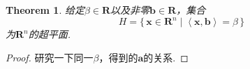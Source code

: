 \documentclass{article}
\newtheorem{theorem}{Theorem}[section]
\newcommand\Set[2]{\{\,#1\mid#2\,\}} %
\newcommand{\vect}[1]{\mathbf{#1}} %
\newcommand{\thereal}{\mathbf{R}} %
\newcommand{\inprod}[2]{\left<#1,#2\right>} %
\begin{document}
\begin{theorem}
\rm 给定$\beta \in \thereal$以及非零$\vect{b} \in \thereal$，集合
$$
H = \Set{\vect{x} \in \thereal^n}{\inprod{\vect{x}}{\vect{b}}=\beta}
$$
为$\thereal^n$的超平面. 
\end{theorem}

\begin{proof}
研究一下同一$\beta$，得到的$\vect{a}$的关系.
\end{proof}
\end{document}
